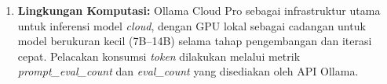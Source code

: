 \begin{enumerate}
	\item \textbf{Lingkungan Komputasi:} Ollama Cloud Pro sebagai infrastruktur utama untuk inferensi model \textit{cloud}, dengan GPU lokal sebagai cadangan untuk model berukuran kecil (7B--14B) selama tahap pengembangan dan iterasi cepat. Pelacakan konsumsi \textit{token} dilakukan melalui metrik \textit{prompt\_eval\_count} dan \textit{eval\_count} yang disediakan oleh API Ollama.
\end{enumerate}
